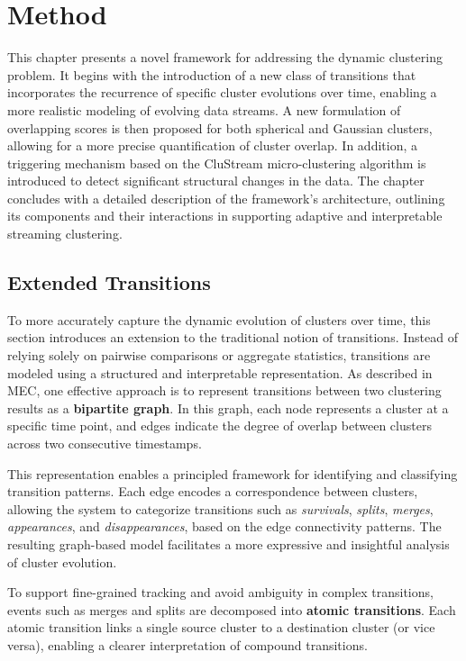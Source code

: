 \chapter{Method}\label{ch:method}

This chapter presents a novel framework for addressing the dynamic clustering
problem. It begins with the introduction of a new class of transitions that
incorporates the recurrence of specific cluster evolutions over time, enabling
a more realistic modeling of evolving data streams. A new formulation of
overlapping scores is then proposed for both spherical and Gaussian clusters,
allowing for a more precise quantification of cluster overlap. In addition, a
triggering mechanism based on the CluStream micro-clustering algorithm is
introduced to detect significant structural changes in the data. The chapter
concludes with a detailed description of the framework's architecture,
outlining its components and their interactions in supporting adaptive and
interpretable streaming clustering.

\section{Extended Transitions}\label{sec:extended_transitions}

To more accurately capture the dynamic evolution of clusters over time, this
section introduces an extension to the traditional notion of transitions.
Instead of relying solely on pairwise comparisons or aggregate statistics,
transitions are modeled using a structured and interpretable representation. As
described in MEC, one effective approach is to represent transitions between
two clustering results as a \textbf{bipartite graph}. In this graph, each node
represents a cluster at a specific time point, and edges indicate the degree of
overlap between clusters across two consecutive timestamps.

This representation enables a principled framework for identifying and
classifying transition patterns. Each edge encodes a correspondence between
clusters, allowing the system to categorize transitions such as
\emph{survivals}, \emph{splits}, \emph{merges}, \emph{appearances}, and
\emph{disappearances}, based on the edge connectivity patterns. The resulting
graph-based model facilitates a more expressive and insightful analysis of
cluster evolution.



To support fine-grained tracking and avoid ambiguity in complex transitions,
events such as merges and splits are decomposed into \textbf{atomic
      transitions}. Each atomic transition links a single source cluster to a
destination cluster (or vice versa), enabling a clearer interpretation of
compound transitions.

